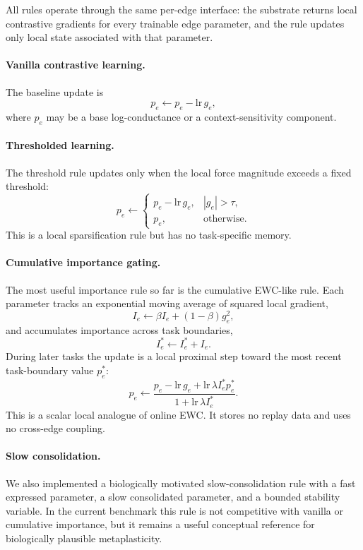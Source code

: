 \documentclass[11pt]{article}
\begin{document}
All rules operate through the same per-edge interface: the substrate
returns local contrastive gradients for every trainable edge parameter,
and the rule updates only local state associated with that parameter.

\paragraph{Vanilla contrastive learning.}
The baseline update is
\[
p_e \leftarrow p_e - \mathrm{lr}\,g_e,
\]
where $p_e$ may be a base log-conductance or a context-sensitivity
component.

\paragraph{Thresholded learning.}
The threshold rule updates only when the local force magnitude exceeds
a fixed threshold:
\[
p_e \leftarrow
\begin{cases}
p_e - \mathrm{lr}\,g_e, & |g_e| > \tau,\\
p_e, & \text{otherwise}.
\end{cases}
\]
This is a local sparsification rule but has no task-specific memory.

\paragraph{Cumulative importance gating.}
The most useful importance rule so far is the cumulative EWC-like rule.
Each parameter tracks an exponential moving average of squared local
gradient,
\[
I_e \leftarrow \beta I_e + (1-\beta)g_e^2,
\]
and accumulates importance across task boundaries,
\[
I^*_e \leftarrow I^*_e + I_e.
\]
During later tasks the update is a local proximal step toward the most
recent task-boundary value $p^*_e$:
\[
p_e \leftarrow
\frac{p_e - \mathrm{lr}\,g_e
      + \mathrm{lr}\,\lambda I^*_e p^*_e}
     {1 + \mathrm{lr}\,\lambda I^*_e}.
\]
This is a scalar local analogue of online EWC. It stores no replay data
and uses no cross-edge coupling.

\paragraph{Slow consolidation.}
We also implemented a biologically motivated slow-consolidation rule
with a fast expressed parameter, a slow consolidated parameter, and a
bounded stability variable. In the current benchmark this rule is not
competitive with vanilla or cumulative importance, but it remains a
useful conceptual reference for biologically plausible metaplasticity.
\end{document}
